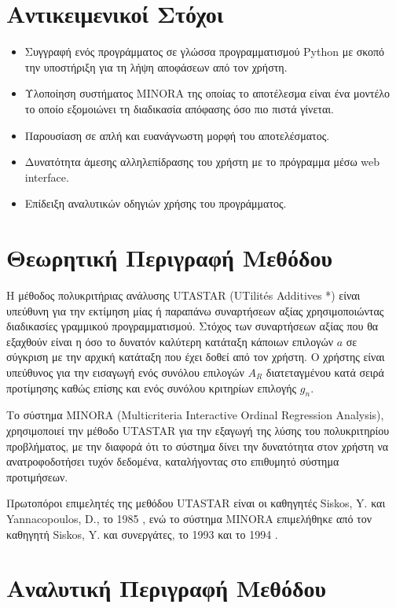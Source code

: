 \documentclass[11pt,a4paper,titlepage]{article}
\numberwithin{equation}{section}
\begin{document}
\section{Αντικειμενικοί Στόχοι}
\label{sec:goals}   
\begin{itemize}
	\item Συγγραφή ενός προγράμματος σε γλώσσα προγραμματισμού Python με σκοπό την υποστήριξη για τη λήψη αποφάσεων από τον χρήστη.
	\item Υλοποίηση συστήματος MINORA της οποίας το αποτέλεσμα είναι ένα μοντέλο το οποίο εξομοιώνει τη διαδικασία απόφασης όσο πιο πιστά γίνεται.
	\item Παρουσίαση σε απλή και ευανάγνωστη μορφή του αποτελέσματος.
	\item Δυνατότητα άμεσης αλληλεπίδρασης του χρήστη με το πρόγραμμα μέσω web interface.
	\item Επίδειξη αναλυτικών οδηγιών χρήσης του προγράμματος.
\end{itemize}


\section{Θεωρητική Περιγραφή Μεθόδου}
\label{sec:theory}
Η μέθοδος πολυκριτήριας ανάλυσης UTASTAR (UTilités Additives *) είναι υπεύθυνη για την εκτίμηση μίας ή παραπάνω συναρτήσεων αξίας χρησιμοποιώντας διαδικασίες γραμμικού προγραμματισμού. Στόχος των συναρτήσεων αξίας που θα εξαχθούν είναι η όσο το δυνατόν καλύτερη κατάταξη κάποιων επιλογών $a$ σε σύγκριση με την αρχική κατάταξη που έχει δοθεί από τον χρήστη. Ο χρήστης είναι υπεύθυνος για την εισαγωγή ενός συνόλου επιλογών $A_{R}$ διατεταγμένου κατά σειρά προτίμησης καθώς επίσης και ενός συνόλου κριτηρίων επιλογής $g_{n}$. 

Το σύστημα MINORA (Multicriteria Interactive Ordinal Regression Analysis), χρησιμοποιεί την μέθοδο UTASTAR για την εξαγωγή της λύσης του πολυκριτηρίου προβλήματος, με την διαφορά ότι το σύστημα δίνει την δυνατότητα στον χρήστη να ανατροφοδοτήσει τυχόν δεδομένα, καταλήγοντας στο επιθυμητό σύστημα προτιμήσεων.

Πρωτοπόροι επιμελητές της μεθόδου UTASTAR είναι οι καθηγητές Siskos, Y. και Yannacopoulos, D., το 1985 \cite{utastar}, ενώ το σύστημα MINORA επιμελήθηκε από τον καθηγητή Siskos, Y. και συνεργάτες, το 1993 \cite{minora} και το 1994 \cite{SISKOS1994151}.

\newpage

\section{Αναλυτική Περιγραφή Μεθόδου}
\label{sec:theory_in_depth}
\end{document}
